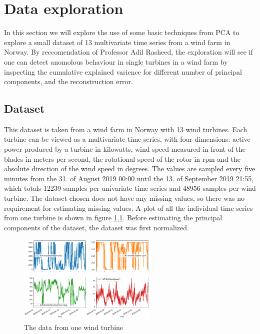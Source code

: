 \chapter{Data exploration}

In this section we will explore the use of some basic techniques from PCA to explore a small dataset of 13 multivariate time series from a wind farm in Norway.  
By reccomendation of Professor Adil Rasheed, the exploration will see if one can detect anomolous behaviour in single turbines in a wind farm by inspecting the cumulative explained varience for different number of principal components, and the reconstruction error.

\section{Dataset}

This dataset is taken from a wind farm in Norway with 13 wind turbines. 
Each turbine can be viewed as a multivariate time series, with four dimensions: active power produced by a turbine in kilowatts, wind speed measured in front of the blades in meters per second, the rotational speed of the rotor in rpm and the absolute direction of the wind speed in degrees. 
The values are sampled every five minutes from the 31. of August 2019 00:00 until the 13. of September 2019 21:55, which totals 12239 samples per univariate time series and 48956 samples per wind turbine. 
The dataset chosen does not have any missing values, so there was no requirement for estimating missing values. 
A plot of all the individual time series from one turbine is shown in figure \ref{fig:data_one_wt}.
Before estimating the principal components of the dataset, the dataset was first normalized. \bigskip

\begin{figure}
    \begin{center}
    \includegraphics[width=0.6\textwidth]{data_exp/one_turbine_all_vals}
    \end{center}
    \caption{The data from one wind turbine} 
    \label{fig:data_one_wt}
\end{figure}

